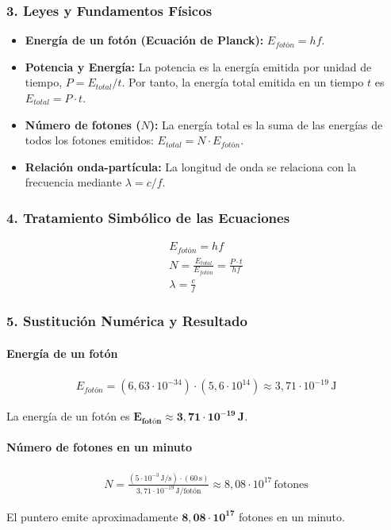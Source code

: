 \subsubsection*{3. Leyes y Fundamentos Físicos}
\begin{itemize}
    \item \textbf{Energía de un fotón (Ecuación de Planck):} $E_{fotón} = hf$.
    \item \textbf{Potencia y Energía:} La potencia es la energía emitida por unidad de tiempo, $P = E_{total}/t$. Por tanto, la energía total emitida en un tiempo $t$ es $E_{total} = P \cdot t$.
    \item \textbf{Número de fotones ($N$):} La energía total es la suma de las energías de todos los fotones emitidos: $E_{total} = N \cdot E_{fotón}$.
    \item \textbf{Relación onda-partícula:} La longitud de onda se relaciona con la frecuencia mediante $\lambda = c/f$.
\end{itemize}

\subsubsection*{4. Tratamiento Simbólico de las Ecuaciones}
\begin{gather}
    E_{fotón} = hf \\
    N = \frac{E_{total}}{E_{fotón}} = \frac{P \cdot t}{hf} \\
    \lambda = \frac{c}{f}
\end{gather}

\subsubsection*{5. Sustitución Numérica y Resultado}
\paragraph*{Energía de un fotón}
\begin{gather}
    E_{fotón} = (6,63\cdot10^{-34}) \cdot (5,6\cdot10^{14}) \approx 3,71 \cdot 10^{-19} \, \text{J}
\end{gather}
\begin{cajaresultado}
    La energía de un fotón es $\boldsymbol{E_{fotón} \approx 3,71 \cdot 10^{-19} \, J}$.
\end{cajaresultado}

\paragraph*{Número de fotones en un minuto}
\begin{gather}
    N = \frac{(5 \cdot 10^{-3} \, \text{J/s}) \cdot (60 \, \text{s})}{3,71 \cdot 10^{-19} \, \text{J/fotón}} \approx 8,08 \cdot 10^{17} \, \text{fotones}
\end{gather}
\begin{cajaresultado}
    El puntero emite aproximadamente $\boldsymbol{8,08 \cdot 10^{17}}$ fotones en un minuto.
\end{cajaresultado}

